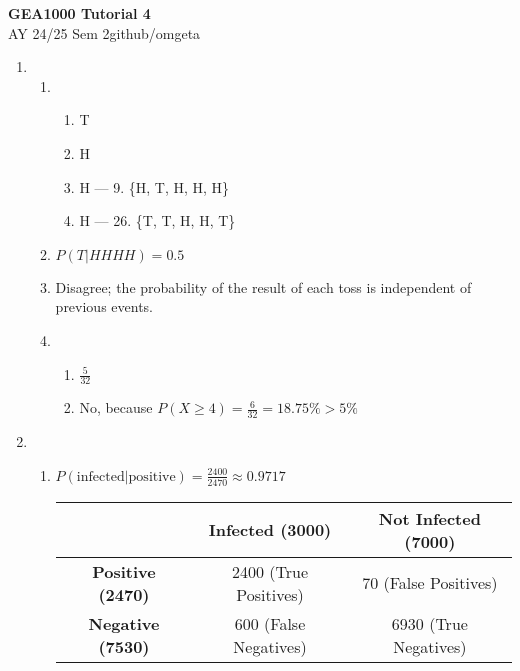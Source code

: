 \documentclass[12pt, a4paper]{article}
\newcommand{\mytitle}{GEA1000 Tutorial 4}
\newcommand{\myauthor}{github/omgeta}
\newcommand{\mydate}{AY 24/25 Sem 2}
\begin{document}
\raggedright
\footnotesize
\begin{center}
{\normalsize{\textbf{\mytitle}}} \\
{\footnotesize{\mydate\hspace{2pt}\textemdash\hspace{2pt}\myauthor}}
\end{center}
\begin{enumerate}[Q\arabic*.]
  \item 
    \begin{enumerate}[(\alph*.)]
      \item
        \begin{enumerate}[(\roman*.)]
          \item T
          \item H
          \item H --- 9. \{H, T, H, H, H\}\\
          \item H --- 26. \{T, T, H, H, T\}
        \end{enumerate}

      \item $P(T|HHHH) = 0.5$

      \item Disagree; the probability of the result of each toss is independent of previous events.

      \item 
        \begin{enumerate}[(\roman*.)]
          \item $\frac{5}{32}$

          \item No, because $P(X \geq 4) = \frac{6}{32} = 18.75\% > 5\%$
        \end{enumerate}
    \end{enumerate}

  \item 
    \begin{enumerate}[(\alph*.)]
      \item $P(\text{infected} | \text{positive}) = \frac{2400}{2470} \approx 0.9717$
        \begin{table}[h!]
        \centering
        \begin{tabular}{|c|c|c|}
        \hline
         & \textbf{Infected (3000)} & \textbf{Not Infected (7000)} \\
        \hline
        \textbf{Positive (2470)} & 2400 (True Positives) & 70 (False Positives) \\
        \hline
        \textbf{Negative (7530)} & 600 (False Negatives) & 6930 (True Negatives) \\
        \hline
        \end{tabular}
        \end{table}


\end{enumerate}
\end{enumerate}
\end{document}
